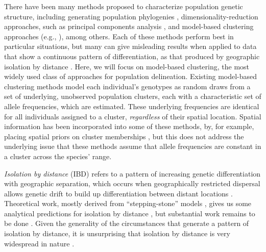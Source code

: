 \documentclass[10pt,letterpaper]{article}
\begin{document}
There have been many methods proposed to characterize population
genetic structure,
including generating population phylogenies \cite{CavalliSforza1975, treemix},
dimensionality-reduction approaches, 
such as principal components analysis 
\cite{meirmans2009genodive,menozzi1978synthetic,novembre_interpreting_2008, price2006eigenstrat},
and model-based clustering approaches 
(e.g., \cite{STRUCTURE, falush2003, hubisz2009,ADMIXTURE, 
FINESTRUCTURE, fastStructure, huelsenbeck2007inference, 
Corander2003,TESS,geneland}), among others.
Each of these methods perform best in particular situations,
but many can give misleading results when applied to data 
that show a continuous pattern of differentiation,
as that produced by geographic isolation by distance 
\cite{Wright1943, novembre_interpreting_2008, Frantz2009}.
Here, we will focus on model-based clustering, the most widely used class of approaches for population delineation.
Existing model-based clustering methods model each individual's genotypes 
as random draws from a set of underlying, unobserved population clusters, 
each with a characteristic set of allele frequencies, which are estimated. 
These underlying frequencies are identical 
for all individuals assigned to a cluster, 
\emph{regardless} of their spatial location. 
Spatial information has been incorporated into some of these methods, 
by, for example, placing spatial priors on cluster memberships \cite{geneland,TESS}, 
but this does not address the underlying issue that 
these methods assume that allele frequencies 
are constant in a cluster across the species' range.  

\emph{Isolation by distance} (IBD) refers to a pattern of increasing genetic differentiation
with geographic separation,
which occurs when geographically restricted dispersal allows
genetic drift to build up differentiation between distant locations
\cite{Wright1943}. 
Theoretical work,
mostly derived from ``stepping-stone'' models 
\cite{kimura1964stepping,sawyer1976stepping,shiga1984stepping},
gives us some analytical predictions for isolation by distance
\cite{malecot1969mathematics,Slatkin1985,epperson2003geographical}, 
but substantial work remains to be done \cite{barton2002neutral,barton2013modelling}.
Given the generality of the circumstances that generate a pattern of isolation by distance, 
it is unsurprising that isolation by distance is very widespread in nature \cite{meirmans2012,Sexton_etal_2014}.
\end{document}
